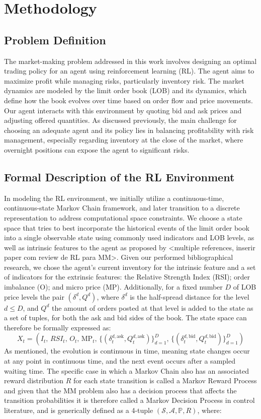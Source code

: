 \section{Methodology}

\subsection{Problem Definition}
The market-making problem addressed in this work involves designing an optimal trading policy for an agent using reinforcement learning (RL). The agent aims to maximize profit while managing risks, particularly inventory risk. The market dynamics are modeled by the limit order book (LOB) and its dynamics, which define how the book evolves over time based on order flow and price movements. Our agent interacts with this environment by quoting bid and ask prices and adjusting offered quantities. As discussed previously, the main challenge for choosing an adequate agent and its policy lies in balancing profitability with risk management, especially regarding inventory at the close of the market, where overnight positions can expose the agent to significant risks.

\subsection{Formal Description of the RL Environment} In modeling the RL environment, we initially utilize a continuous-time, continuous-state Markov Chain framework, and later transition to a discrete representation to address computational space constraints. We choose a state space that tries to best incorporate the historical events of the limit order book into a single observable state using commonly used indicators and LOB levels, as well as intrinsic features to the agent as proposed by <multiple references, inserir paper com review de RL para MM>. Given our performed bibliographical research, we chose the agent's current inventory for the intrinsic feature and a set of indicators for the extrinsic features: the Relative Strength Index (RSI); order imbalance (O); and micro price (MP). Additionally, for a fixed number $D$ of LOB price levels the pair $(\delta^d, Q^d)$, where $\delta^d$ is the half-spread distance for the level $d \leq D$, and $Q^d$ the amount of orders posted at that level is added to the state as a set of tuples, for both the ask and bid sides of the book. The state space can therefore be formally expressed as:
$$
X_t = (I_t, \, RSI_t, \, O_t, \, \text{MP}_t, \, \{ (\delta_t^{d, \text{ask}}, Q_t^{d, \text{ask}}) \}_{d=1}^D, \, \{ (\delta_t^{d, \text{bid}}, Q_t^{d, \text{bid}}) \}_{d=1}^D)
$$
As mentioned, the evolution is continuous in time, meaning state changes occur at any point in continuous time, and the next event occurs after a sampled waiting time. The specific case in which a Markov Chain also has an associated reward distribution $R$ for each state transition is called a Markov Reward Process and given that the MM problem also has a decision process that affects the transition probabilities it is therefore called a Markov Decision Process in control literature, and is generically defined as a 4-tuple $ (\mathcal{S}, \mathcal{A}, \mathbb{P}, R) $, where:

